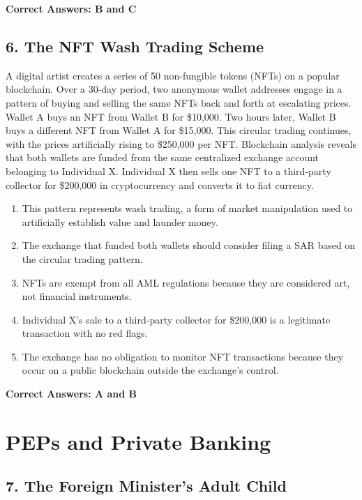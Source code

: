 \documentclass[11pt,a4paper]{article}
\begin{document}
	\textbf{Correct Answers: B and C}
	
	\subsection{6. The NFT Wash Trading Scheme}
	
	A digital artist creates a series of 50 non-fungible tokens (NFTs) on a popular blockchain. Over a 30-day period, two anonymous wallet addresses engage in a pattern of buying and selling the same NFTs back and forth at escalating prices. Wallet A buys an NFT from Wallet B for \$10,000. Two hours later, Wallet B buys a different NFT from Wallet A for \$15,000. This circular trading continues, with the prices artificially rising to \$250,000 per NFT. Blockchain analysis reveals that both wallets are funded from the same centralized exchange account belonging to Individual X. Individual X then sells one NFT to a third-party collector for \$200,000 in cryptocurrency and converts it to fiat currency.
	
	\begin{enumerate}[label=\Alph*.]
		\item This pattern represents wash trading, a form of market manipulation used to artificially establish value and launder money.
		\item The exchange that funded both wallets should consider filing a SAR based on the circular trading pattern.
		\item NFTs are exempt from all AML regulations because they are considered art, not financial instruments.
		\item Individual X's sale to a third-party collector for \$200,000 is a legitimate transaction with no red flags.
		\item The exchange has no obligation to monitor NFT transactions because they occur on a public blockchain outside the exchange's control.
	\end{enumerate}
	
	\textbf{Correct Answers: A and B}
	
	\section{PEPs and Private Banking}
	
	\subsection{7. The Foreign Minister's Adult Child}
	
\end{document}
